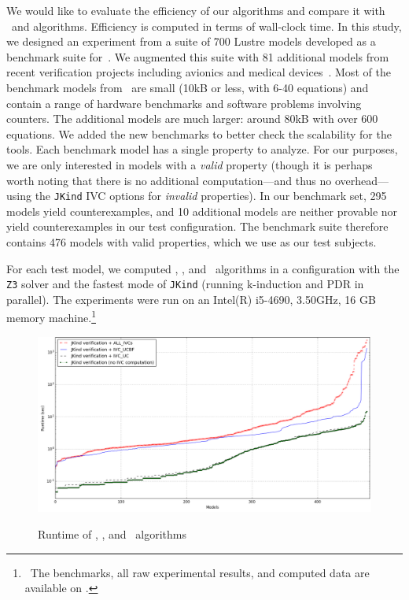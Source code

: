 
\newcommand{\takeaway}[1]{
\vspace{6pt}
\noindent\fbox{\parbox{\textwidth}{#1}}
\vspace{6pt}
}
 
 We would like to evaluate the efficiency 
 of our algorithms and compare it with \ucalg ~and \ucbfalg algorithms. 
 Efficiency is computed in terms of wall-clock time. 
 In this study, we designed an experiment from a suite of 700 Lustre models developed
as a benchmark suite for~\cite{Hagen08:FMCAD}. 
We augmented this suite
with 81 additional models from recent verification projects including
avionics and medical devices~\cite{QFCS15:backes,hilt2013}.
 Most of
the benchmark models from~\cite{Hagen08:FMCAD} are small (10kB or less,
with 6-40 equations) and contain a range of hardware benchmarks and
software problems involving counters. 
The additional models are much
larger: around 80kB with over 600 equations. We added the new
benchmarks to better check the scalability for the tools. 
Each benchmark model has a single property to analyze.  For our purposes, we are only interested in models with a {\em valid} property (though it is perhaps worth noting that there is no additional computation---and thus no overhead---using the \texttt{JKind} IVC options for {\em invalid} properties).  In our benchmark set, 295 models yield counterexamples, and 10 additional models are neither provable nor yield counterexamples in our test configuration.  The benchmark suite therefore contains 476 models with valid properties, which we use as our test subjects.

For each test model, we computed \aivcalg , \ucalg , and \ucbfalg ~algorithms
in a configuration with
the \texttt{Z3} solver and the fastest mode of \texttt{JKind} (running k-induction and PDR in parallel). The experiments
were run on an  Intel(R) i5-4690, 3.50GHz,
16 GB memory machine.\footnote{\noindent ~The benchmarks, all raw experimental results,
  and computed data are available on \cite{expr}.}
  
\begin{figure}[t]
 \centering
  \includegraphics[width=\textwidth]{figs/performance-sorted.png}
  \label{fig:performance}
  \vspace{-0.2in}
  \caption{Runtime of \aivcalg, \ucbfalg, and \ucalg ~algorithms}
\end{figure}  
  
